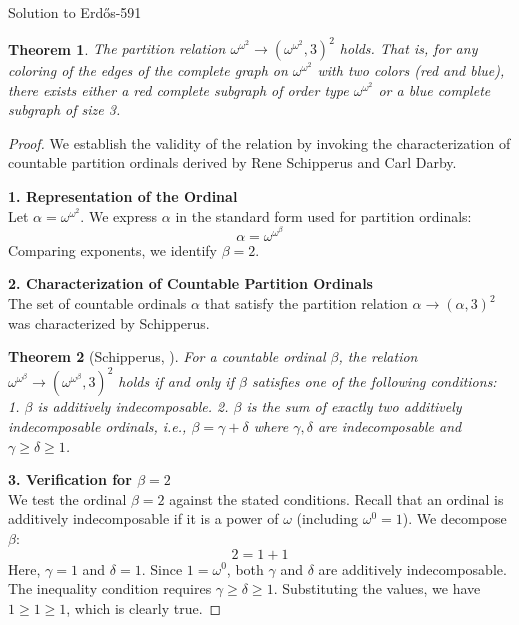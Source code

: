 \documentclass{article}
\theoremstyle{plain}
\newtheorem{theorem}{Theorem}
\theoremstyle{definition}
\begin{document}
\begin{solution}{Solution to {Erdős-591}}
\begin{theorem}
    The partition relation $\omega^{\omega^2} \to (\omega^{\omega^2}, 3)^2$ holds. That is, for any coloring of the edges of the complete graph on $\omega^{\omega^2}$ with two colors (red and blue), there exists either a red complete subgraph of order type $\omega^{\omega^2}$ or a blue complete subgraph of size 3.
\end{theorem}

\begin{proof}

We establish the validity of the relation by invoking the characterization of countable partition ordinals derived by Rene Schipperus and Carl Darby.

\medskip
\textbf{1. Representation of the Ordinal}\\
Let $\alpha = \omega^{\omega^2}$. We express $\alpha$ in the standard form used for partition ordinals:
$$ \alpha = \omega^{\omega^\beta} $$
Comparing exponents, we identify $\beta = 2$.

\medskip
\textbf{2. Characterization of Countable Partition Ordinals}\\
The set of countable ordinals $\alpha$ that satisfy the partition relation $\alpha \to (\alpha, 3)^2$ was characterized by Schipperus.

\begin{theorem}[Schipperus, \cite{Sch10}]
    For a countable ordinal $\beta$, the relation $\omega^{\omega^\beta} \to (\omega^{\omega^\beta}, 3)^2$ holds if and only if $\beta$ satisfies one of the following conditions:
    1.  $\beta$ is additively indecomposable.
    2.  $\beta$ is the sum of exactly two additively indecomposable ordinals, i.e., $\beta = \gamma + \delta$ where $\gamma, \delta$ are indecomposable and $\gamma \ge \delta \ge 1$.
\end{theorem}

\textbf{3. Verification for $\beta = 2$}\\
We test the ordinal $\beta = 2$ against the stated conditions.
Recall that an ordinal is additively indecomposable if it is a power of $\omega$ (including $\omega^0 = 1$).
We decompose $\beta$:
$$ 2 = 1 + 1 $$
Here, $\gamma = 1$ and $\delta = 1$.
Since $1 = \omega^0$, both $\gamma$ and $\delta$ are additively indecomposable.
The inequality condition requires $\gamma \ge \delta \ge 1$.
Substituting the values, we have $1 \ge 1 \ge 1$, which is clearly true.


\end{proof}
\end{solution}
\end{document}
